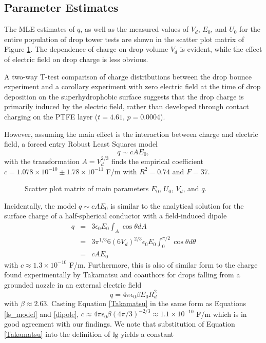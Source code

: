 \documentclass[aip,reprint, floatfix]{revtex4-1}
\begin{document}
\subsection{Parameter Estimates}
The MLE estimates of $q$, as well as the measured values of $V_d$, $E_0$, and $U_0$ for the entire population of drop tower tests are shown in the scatter plot matrix of Figure \ref{fig:scatter}. The dependence of charge on drop volume $V_d$ is evident, while the effect of electric field on drop charge is less obvious.

A two-way T-test comparison of charge distributions between the drop bounce experiment and a corollary experiment with zero electric field at the time of drop deposition on the superhydrophobic surface suggests that the drop charge is primarily induced by the electric field, rather than developed through contact charging on the PTFE layer ($t = 4.61$, $p = 0.0004$).

However, assuming the main effect is the interaction between charge and electric field, a forced entry Robust Least Squares model 
\begin{equation}
q \sim cAE_0,
\label{ls_model}
\end{equation} 
with the transformation $A = V_d^{2/3}$ finds the empirical coefficient $c=1.078 \times 10^{-10} \pm  1.78 \times 10^{-11}$ F/m with $R^2 = 0.74$ and $F=37$. 
\begin{figure}[h]
    \centering
    \resizebox{0.5\textwidth}{!}{}
    \caption{Scatter plot matrix of main parameters $E_0$, $U_0$, $V_d$, and $q$.\label{fig:scatter}}
\end{figure}

Incidentally, the model $q \sim cAE_0$ is similar to the analytical solution for the surface charge of a half-spherical conductor with a field-induced dipole \cite{david_j._griffiths_introduction_1999}
\begin{eqnarray}
q &=& 3 \epsilon_0 E_0 \int_A \cos \theta dA \nonumber \\
&=& 3 \pi^{1/3} 6 \left(6 V_d \right)^{2/3} \epsilon_0 E_0 \int^{\pi / 2}_{0} \!\!\!\!\! \cos \theta d\theta \nonumber \\
&=& c A E_0 \label{dipole}
\end{eqnarray}
with $c \approx 1.3 \times 10^{-10}$ F/m. Furthermore, this is also of similar form to the charge found experimentally by Takamatsu and coauthors for drops falling from a grounded nozzle in an external electric field \cite{takamatsu_theoretical_1981}
\begin{equation}
q = 4 \pi \epsilon_0 \beta E_0 R_d^2
\label{Takamatsu}
\end{equation}
with $\beta \approx 2.63$. Casting Equation \ref{Takamatsu} in the same form as Equations \ref{ls_model} and \ref{dipole}, $c \approx 4 \pi \epsilon_0 \beta (4 \pi/3)^{-2/3} \approx 1.1 \times 10^{-10}$ F/m which is in good agreement with our findings. We note that substitution of Equation \ref{Takamatsu} into the definition of $\mathbb{I}\mbox{g}$ yields a constant
\end{document}
